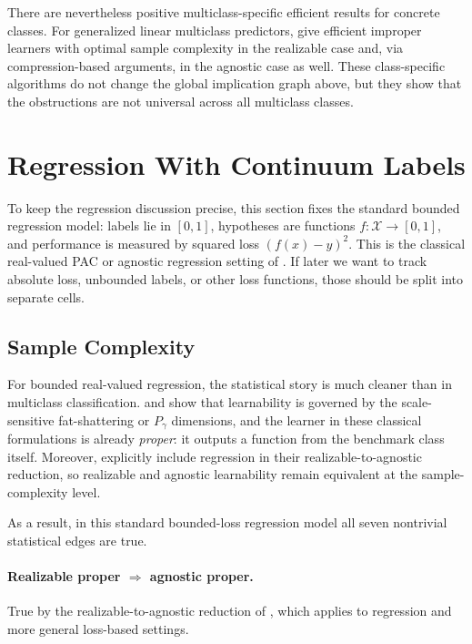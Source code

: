 There are nevertheless positive multiclass-specific efficient results for concrete classes. For generalized linear multiclass predictors, \citet{daniely2014optimal} give efficient improper learners with optimal sample complexity in the realizable case and, via compression-based arguments, in the agnostic case as well. These class-specific algorithms do not change the global implication graph above, but they show that the obstructions are not universal across all multiclass classes.

\section{Regression With Continuum Labels}

To keep the regression discussion precise, this section fixes the standard bounded regression model: labels lie in $[0,1]$, hypotheses are functions $f : \mathcal{X} \to [0,1]$, and performance is measured by squared loss $(f(x)-y)^2$. This is the classical real-valued PAC or agnostic regression setting of \citet{bartlett1996, alon1997}. If later we want to track absolute loss, unbounded labels, or other loss functions, those should be split into separate cells.

\subsection{Sample Complexity}

For bounded real-valued regression, the statistical story is much cleaner than in multiclass classification. \citet{bartlett1996} and \citet{alon1997} show that learnability is governed by the scale-sensitive fat-shattering or $P_\gamma$ dimensions, and the learner in these classical formulations is already \emph{proper}: it outputs a function from the benchmark class itself. Moreover, \citet{hopkins2024} explicitly include regression in their realizable-to-agnostic reduction, so realizable and agnostic learnability remain equivalent at the sample-complexity level.

As a result, in this standard bounded-loss regression model all seven nontrivial statistical edges are true.

\paragraph{Realizable proper $\Rightarrow$ agnostic proper.}
True by the realizable-to-agnostic reduction of \citet{hopkins2024}, which applies to regression and more general loss-based settings.

